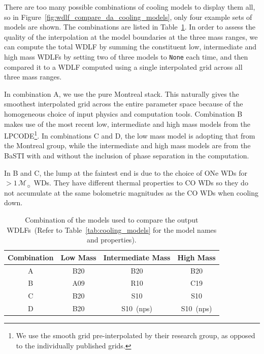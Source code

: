 \documentclass[fleqn,usenatbib]{rasti}
\newcommand{\msun}{\mathcal{M}_{\sun}}
\begin{document}
There are too many possible combinations of cooling models
to display them all, so in
Figure~\ref{fig:wdlf_compare_da_cooling_models}, only four example
sets of models are shown. The combinations are listed in
Table~\ref{tab:cooling_model_combination}. In order to assess the quality of
the interpolation at the model boundaries at the three mass ranges, we can
compute the total WDLF by summing the constituent low, intermediate and high
mass WDLFs by setting two of three models to \texttt{None} each time, and then
compared it to a WDLF computed using a single interpolated grid across
all three mass ranges.

In combination A, we use the pure Montreal stack. This naturally gives the
smoothest interpolated grid across the entire parameter space because of the
homogeneous choice of input physics and computation tools. Combination B makes
use of the most recent low, intermediate and high mass models from the
LPCODE\footnote{We use the smooth grid pre-interpolated by
their research group, as opposed to the individually published grids.}.
In combinations C and D, the low mass model is adopting that from the Montreal
group, while the intermediate and high mass models are from the BaSTI with and
without the inclusion of phase separation in the computation.

In B and C, the lump at the faintest end is due to the choice of ONe WDs for
$>1\,\msun$ WDs. They have different thermal properties to CO WDs so
they do not accumulate at the same bolometric magnitudes as the CO WDs when
cooling down.

\begin{table}
    \centering
    \begin{tabular}{cccc}
        Combination & Low Mass & Intermediate Mass & High Mass \\ \hline\hline
        A           & B20      & B20               & B20 \\
        B           & A09      & R10               & C19 \\
        C           & B20      & S10               & S10 \\
        D           & B20      & S10~(nps)         & S10~(nps) \\
    \end{tabular}
    \caption{Combination of the models used to compare the output WDLFs~(Refer
    to Table~\ref{tab:cooling_models} for the model names and properties).}
    \label{tab:cooling_model_combination}
\end{table}
\end{document}
